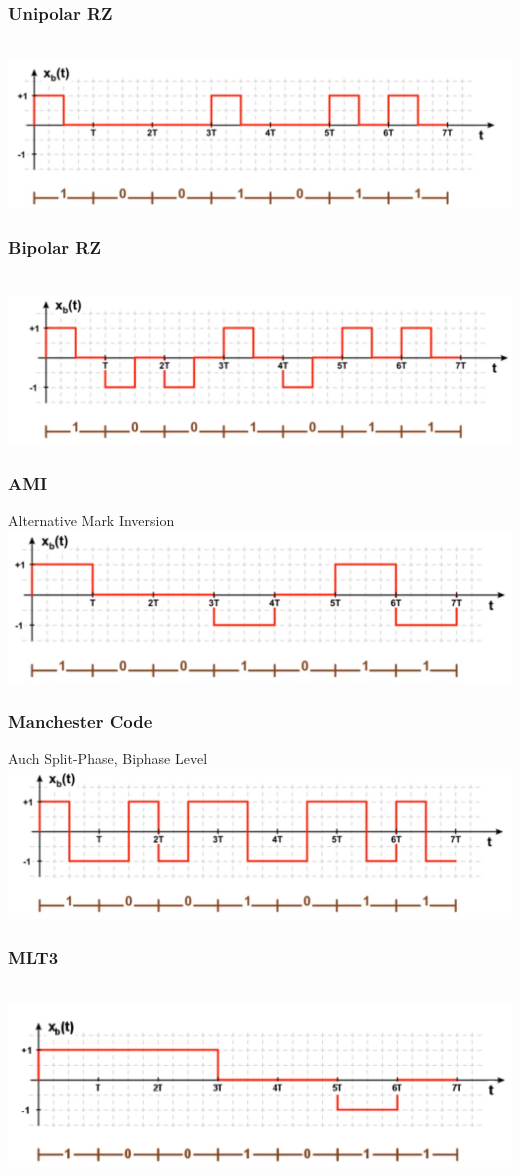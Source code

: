 \subsubsection{Unipolar RZ}\\
\includegraphics[width=0.6\columnwidth]{Images/urz}

\subsubsection{Bipolar RZ}\\
\includegraphics[width=0.6\columnwidth]{Images/brz}

\subsubsection{AMI}
Alternative Mark Inversion\\
\includegraphics[width=0.6\columnwidth]{Images/ami}

\subsubsection{Manchester Code}
Auch Split-Phase, Biphase Level\\
\includegraphics[width=0.6\columnwidth]{Images/manchester}

\subsubsection{MLT3}\\
\includegraphics[width=0.6\columnwidth]{Images/mlt3}

